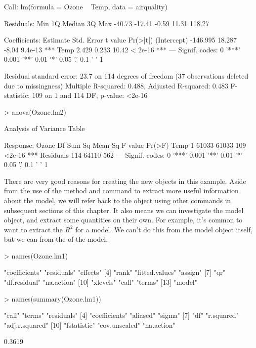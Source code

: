 \begin{Schunk}
\begin{Soutput}
Call:
lm(formula = Ozone ~ Temp, data = airquality)

Residuals:
   Min     1Q Median     3Q    Max 
-40.73 -17.41  -0.59  11.31 118.27 

Coefficients:
            Estimate Std. Error t value Pr(>|t|)    
(Intercept) -146.995     18.287   -8.04  9.4e-13 ***
Temp           2.429      0.233   10.42  < 2e-16 ***
---
Signif. codes:  
0 '***' 0.001 '**' 0.01 '*' 0.05 '.' 0.1 ' ' 1

Residual standard error: 23.7 on 114 degrees of freedom
  (37 observations deleted due to missingness)
Multiple R-squared:  0.488,	Adjusted R-squared:  0.483 
F-statistic:  109 on 1 and 114 DF,  p-value: <2e-16
\end{Soutput}
\begin{Sinput}
> anova(Ozone.lm2)
\end{Sinput}
\begin{Soutput}
Analysis of Variance Table

Response: Ozone
           Df Sum Sq Mean Sq F value Pr(>F)    
Temp        1  61033   61033     109 <2e-16 ***
Residuals 114  64110     562                   
---
Signif. codes:  
0 '***' 0.001 '**' 0.01 '*' 0.05 '.' 0.1 ' ' 1
\end{Soutput}
\end{Schunk}
There are very good reasons for creating the new objects in this example. Aside from the use of the  method and  command to extract more useful information about the model, we will refer back to the object using other commands in subsequent sections of this chapter. It also means we can investigate the model object, and extract some quantities on their own. For example, it's common to want to extract the $R^2$ for a model. We can't do this from the model object itself, but we can from the  of the model.
\begin{Schunk}
\begin{Sinput}
> names(Ozone.lm1)
\end{Sinput}
\begin{Soutput}
 [1] "coefficients"  "residuals"     "effects"      
 [4] "rank"          "fitted.values" "assign"       
 [7] "qr"            "df.residual"   "na.action"    
[10] "xlevels"       "call"          "terms"        
[13] "model"        
\end{Soutput}
\begin{Sinput}
> names(summary(Ozone.lm1))
\end{Sinput}
\begin{Soutput}
 [1] "call"          "terms"         "residuals"    
 [4] "coefficients"  "aliased"       "sigma"        
 [7] "df"            "r.squared"     "adj.r.squared"
[10] "fstatistic"    "cov.unscaled"  "na.action"    
\end{Soutput}
\begin{Soutput}
[1] 0.3619
\end{Soutput}
\end{Schunk}



